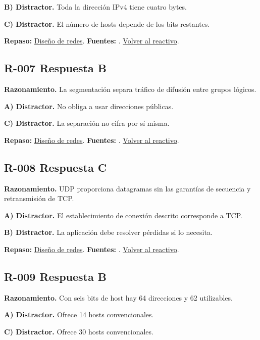 \textbf{B) Distractor. }Toda la dirección IPv4 tiene cuatro bytes.

\textbf{C) Distractor. }El número de hosts depende de los bits restantes.

\textbf{Repaso:} \hyperref[sec:r1]{Diseño de redes}. \textbf{Fuentes:} \cite{rfc8200,rfc4632,networks,vlan}. \hyperref[q:R-006]{Volver al reactivo}.\par\medskip

\subsection*{R-007 \quad Respuesta B}\label{s:R-007}
\textbf{Razonamiento.} La segmentación separa tráfico de difusión entre grupos lógicos.

\textbf{A) Distractor. }No obliga a usar direcciones públicas.

\textbf{C) Distractor. }La separación no cifra por sí misma.

\textbf{Repaso:} \hyperref[sec:r1]{Diseño de redes}. \textbf{Fuentes:} \cite{rfc8200,rfc4632,networks,vlan}. \hyperref[q:R-007]{Volver al reactivo}.\par\medskip

\subsection*{R-008 \quad Respuesta C}\label{s:R-008}
\textbf{Razonamiento.} UDP proporciona datagramas sin las garantías de secuencia y retransmisión de TCP.

\textbf{A) Distractor. }El establecimiento de conexión descrito corresponde a TCP.

\textbf{B) Distractor. }La aplicación debe resolver pérdidas si lo necesita.

\textbf{Repaso:} \hyperref[sec:r1]{Diseño de redes}. \textbf{Fuentes:} \cite{rfc8200,rfc4632,networks,vlan}. \hyperref[q:R-008]{Volver al reactivo}.\par\medskip

\subsection*{R-009 \quad Respuesta B}\label{s:R-009}
\textbf{Razonamiento.} Con seis bits de host hay 64 direcciones y 62 utilizables.

\textbf{A) Distractor. }Ofrece 14 hosts convencionales.

\textbf{C) Distractor. }Ofrece 30 hosts convencionales.

